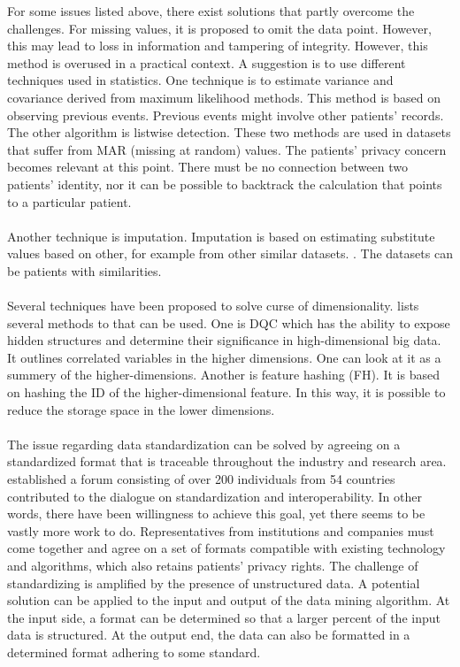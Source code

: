 For some issues listed above, there exist solutions that partly overcome the challenges. For missing values, it is proposed to omit the data point. However, this may lead to loss in information and tampering of integrity. However, this method is overused in a practical context. \cite{wp} A suggestion is to use different techniques used in statistics. One technique is to estimate variance and covariance derived from maximum likelihood methods. This method is based on observing previous events. Previous events might involve other patients' records. The other algorithm is listwise detection. These two methods are used in datasets that suffer from MAR (missing at random) values. \cite{statistics} The patients' privacy concern becomes relevant at this point. There must be no connection between two patients' identity, nor it can be possible to backtrack the calculation that points to a particular patient. 
\\\\
Another technique is imputation. Imputation is based on estimating substitute values based on other, for example from other similar datasets. \cite{imputation}. The datasets can be patients with similarities. 
\\\\
Several techniques have been proposed to solve curse of dimensionality. \cite{cod} lists several methods to that can be used. One is DQC which has the ability to expose hidden structures and determine their significance in high-dimensional big data. It outlines correlated variables in the higher dimensions. One can look at it as a summery of the higher-dimensions. Another is feature hashing (FH). It is based on hashing the ID of the higher-dimensional feature. In this way, it is possible to reduce the storage space in the lower dimensions. 
\\\\
The issue regarding data standardization can be solved by agreeing on a standardized format that is traceable throughout the industry and research area. \cite{who} established a forum consisting of over 200 individuals from 54 countries contributed to the dialogue on standardization and interoperability. In other words, there have been willingness to achieve this goal, yet there seems to be vastly more work to do.  Representatives from institutions and companies must come together and agree on a set of formats compatible with existing technology and algorithms, which also retains patients’ privacy rights. The challenge of standardizing is amplified by the presence of unstructured data. A potential solution can be applied to the input and output of the data mining algorithm. At the input side, a format can be determined so that a larger percent of the input data is structured. At the output end, the data can also be formatted in a determined format adhering to some standard.

